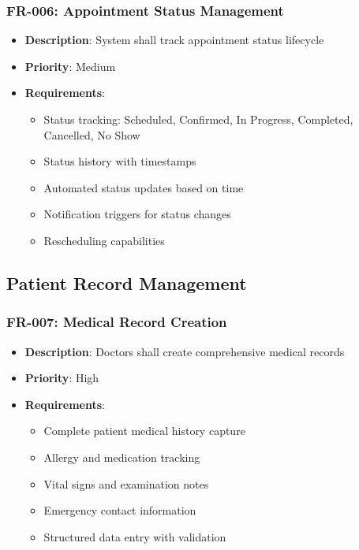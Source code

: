 \documentclass[12pt,a4paper]{article}
\begin{document}
\subsubsection{FR-006: Appointment Status Management}
\begin{itemize}
    \item \textbf{Description}: System shall track appointment status lifecycle
    \item \textbf{Priority}: Medium
    \item \textbf{Requirements}:
    \begin{itemize}
        \item Status tracking: Scheduled, Confirmed, In Progress, Completed, Cancelled, No Show
        \item Status history with timestamps
        \item Automated status updates based on time
        \item Notification triggers for status changes
        \item Rescheduling capabilities
    \end{itemize}
\end{itemize}

\subsection{Patient Record Management}

\subsubsection{FR-007: Medical Record Creation}
\begin{itemize}
    \item \textbf{Description}: Doctors shall create comprehensive medical records
    \item \textbf{Priority}: High
    \item \textbf{Requirements}:
    \begin{itemize}
        \item Complete patient medical history capture
        \item Allergy and medication tracking
        \item Vital signs and examination notes
        \item Emergency contact information
        \item Structured data entry with validation
    \end{itemize}
\end{itemize}
\end{document}
